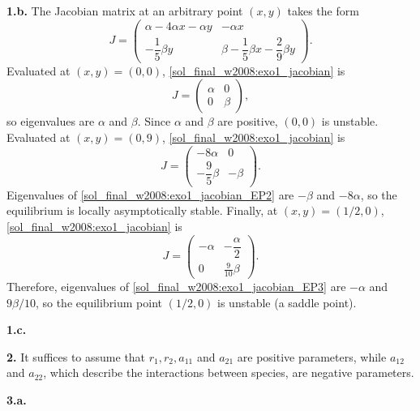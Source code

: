 \documentclass[12pt]{article}
\theoremstyle{plain}
\begin{document}
\textbf{1.b.}
The Jacobian matrix at an arbitrary point $(x,y)$ takes the form
\begin{equation}\label{sol_final_w2008:exo1_jacobian}
J=
\begin{pmatrix}
\alpha-4\alpha x-\alpha y & -\alpha x \\
-\dfrac 15\beta y & \beta-\dfrac 15\beta x -\dfrac 29\beta y
\end{pmatrix}.
\end{equation}
Evaluated at $(x,y)=(0,0)$, \eqref{sol_final_w2008:exo1_jacobian} is
\begin{equation}\label{sol_final_w2008:exo1_jacobian_EP1}
J=
\begin{pmatrix}
\alpha & 0 \\
0 & \beta
\end{pmatrix},
\end{equation}
so eigenvalues are $\alpha$ and $\beta$. Since $\alpha$ and $\beta$ are positive, $(0,0)$ is unstable. Evaluated at $(x,y)=(0,9)$, \eqref{sol_final_w2008:exo1_jacobian} is
\begin{equation}\label{sol_final_w2008:exo1_jacobian_EP2}
J=
\begin{pmatrix}
-8\alpha & 0 \\
-\dfrac 95\beta & -\beta
\end{pmatrix}.
\end{equation}
Eigenvalues of \eqref{sol_final_w2008:exo1_jacobian_EP2} are $-\beta$ and $-8\alpha$, so the equilibrium is locally asymptotically stable. Finally, at $(x,y)=(1/2,0)$, \eqref{sol_final_w2008:exo1_jacobian} is
\begin{equation}\label{sol_final_w2008:exo1_jacobian_EP3}
J=
\begin{pmatrix}
-\alpha & -\dfrac\alpha2 \\
0 & \frac 9{10}\beta
\end{pmatrix}.
\end{equation}
Therefore, eigenvalues of \eqref{sol_final_w2008:exo1_jacobian_EP3} are $-\alpha$ and $9\beta/10$, so the equilibrium point $(1/2,0)$ is unstable (a saddle point).

\textbf{1.c.}



\vskip1cm
\textbf{2.} It suffices to assume that $r_1,r_2,a_{11}$ and $a_{21}$ are positive parameters, while $a_{12}$ and $a_{22}$, which describe the interactions between species, are negative parameters.

\vskip1cm
\textbf{3.a.}
\end{document}
